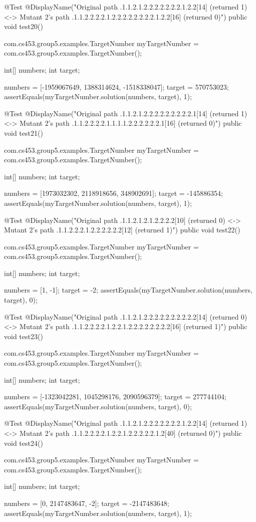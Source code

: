 @Test
@DisplayName("Original path .1.1.2.1.2.2.2.2.2.2.2.1.2.2[14] (returned 1) <-> Mutant 2's path .1.1.2.2.2.2.1.2.2.2.2.2.2.2.2.1.2.2[16] (returned 0)")
public void test20() {
    com.cs453.group5.examples.TargetNumber myTargetNumber = com.cs453.group5.examples.TargetNumber();

    int[] numbers;
    int target;

    numbers = [-1959067649, 1388314624, -1518338047];
    target = 570753023;
    assertEquals(myTargetNumber.solution(numbers, target), 1);
}

@Test
@DisplayName("Original path .1.1.2.1.2.2.2.2.2.2.2.2.2.1[14] (returned 1) <-> Mutant 2's path .1.1.2.2.2.2.1.1.1.1.2.2.2.2.2.2.1[16] (returned 0)")
public void test21() {
    com.cs453.group5.examples.TargetNumber myTargetNumber = com.cs453.group5.examples.TargetNumber();

    int[] numbers;
    int target;

    numbers = [1973032302, 2118918656, 348902691];
    target = -145886354;
    assertEquals(myTargetNumber.solution(numbers, target), 1);
}

@Test
@DisplayName("Original path .1.1.2.1.2.1.2.2.2.2[10] (returned 0) <-> Mutant 2's path .1.1.2.2.2.1.2.2.2.2.2.2[12] (returned 1)")
public void test22() {
    com.cs453.group5.examples.TargetNumber myTargetNumber = com.cs453.group5.examples.TargetNumber();

    int[] numbers;
    int target;

    numbers = [1, -1];
    target = -2;
    assertEquals(myTargetNumber.solution(numbers, target), 0);
}

@Test
@DisplayName("Original path .1.1.2.1.2.2.2.2.2.2.2.2.2.2[14] (returned 0) <-> Mutant 2's path .1.1.2.2.2.2.1.2.2.1.2.2.2.2.2.2.2.2[16] (returned 1)")
public void test23() {
    com.cs453.group5.examples.TargetNumber myTargetNumber = com.cs453.group5.examples.TargetNumber();

    int[] numbers;
    int target;

    numbers = [-1323042281, 1045298176, 2090596379];
    target = 277744104;
    assertEquals(myTargetNumber.solution(numbers, target), 0);
}

@Test
@DisplayName("Original path .1.1.2.1.2.2.2.2.2.2.2.1.2.2[14] (returned 1) <-> Mutant 2's path .1.1.2.2.2.2.1.2.2.1.2.2.2.2.2.1.2[40] (returned 0)")
public void test24() {
    com.cs453.group5.examples.TargetNumber myTargetNumber = com.cs453.group5.examples.TargetNumber();

    int[] numbers;
    int target;

    numbers = [0, 2147483647, -2];
    target = -2147483648;
    assertEquals(myTargetNumber.solution(numbers, target), 1);
}


